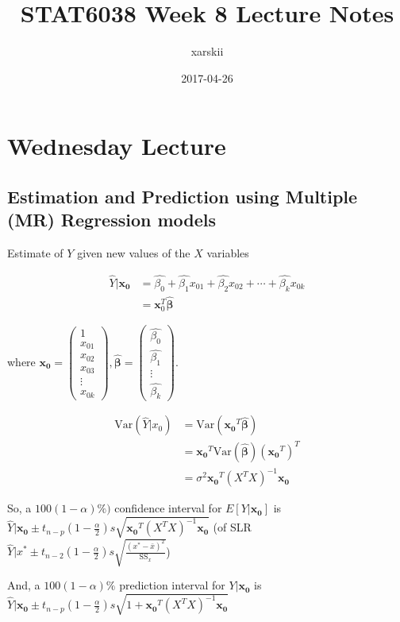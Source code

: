 \documentclass[a4paper, 11pt, twoside]{article}
\begin{document}
\title{STAT6038 Week 8 Lecture Notes}
\author{xarskii}
\date{2017-04-26}

\maketitle

\section{Wednesday Lecture}
\subsection{Estimation and Prediction using Multiple (MR) Regression models}
Estimate of $Y$ given new values of the $X$ variables

\[
\begin{split}
	\hat{Y}|\bm{x_0}&=\hat{\beta_0}+\hat{\beta_1}x_{01}+\hat{\beta_2}x_{02}+\cdots +\hat{\beta_k}x_{0k}\\
	&=\bm{x}^T_0\bm{\hat{\beta}}
\end{split}
\]

where $\bm{x_0}=\begin{pmatrix}1\\x_{01}\\x_{02}\\x_{03}\\\vdots\\x_{0k}\end{pmatrix}, \bm{\hat{\beta}}=\begin{pmatrix}\hat{\beta_0}\\\hat{\beta_1}\\\vdots\\\hat{\beta_k}\end{pmatrix}.$


\[
\begin{split}
	\text{Var}(\hat{Y}|x_0)&=\text{Var}(\bm{x_0}^T\bm{\hat{\beta}})\\
	&=\bm{x_0}^T\text{Var}(\bm{\hat{\beta}})(\bm{x_0}^T)^T\\
	&=\sigma^2\bm{x_0}^T(X^TX)^{-1}\bm{x_0}
\end{split}
\]

So, a $100(1-\alpha)\%)$ confidence interval for $E[Y|\bm{x_0}]$ is $\hat{Y}|\bm{x_0}\pm t_{n-p}(1-\frac{\alpha}{2})s\sqrt{\bm{x_0}^T(X^TX)^{-1}\bm{x_0}}$ (of SLR $\hat{Y}|x^{*}\pm t_{n-2}(1-\frac{\alpha}{2})s\sqrt{\frac{(x^*-\bar{x})^2}{\text{SS}_x}}$)

And, a $100(1-\alpha)\%$ prediction interval for $Y|\bm{x_0}$ is $\hat{Y}|\bm{x_0}\pm t_{n-p}(1-\frac{\alpha}{2})s\sqrt{1+\bm{x_0}^T(X^TX)^{-1}\bm{x_0}}$
\end{document}
